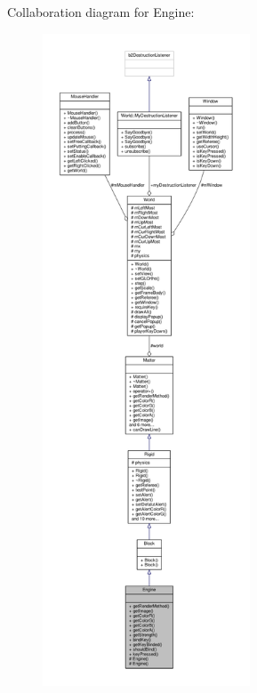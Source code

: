 Collaboration diagram for Engine\+:\nopagebreak
\begin{figure}[H]
\begin{center}
\leavevmode
\includegraphics[height=550pt]{classEngine__coll__graph}
\end{center}
\end{figure}
